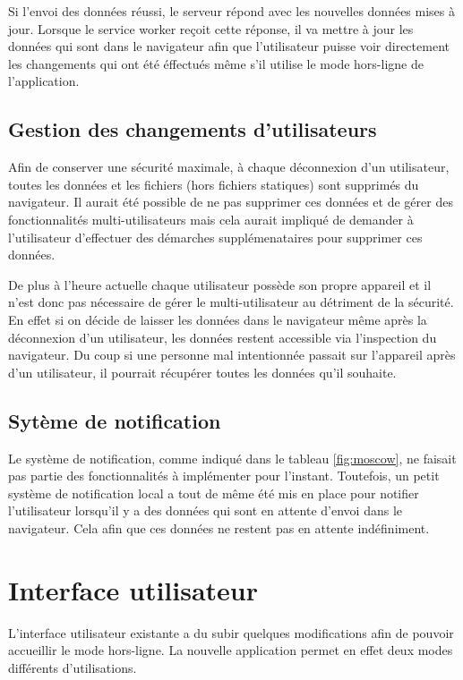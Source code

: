 \documentclass{EPL-master-thesis-covers-FR}
\begin{document}
					Si l'envoi des données réussi, le serveur répond avec les nouvelles données mises à jour. Lorsque le service worker reçoit cette réponse, il va mettre à jour les données qui sont dans le navigateur afin que l'utilisateur puisse voir directement les changements qui ont été éffectués même s'il utilise le mode hors-ligne de l'application.
			
			\subsection{Gestion des changements d'utilisateurs}		
				Afin de conserver une sécurité maximale, à chaque déconnexion d'un utilisateur, toutes les données et les fichiers (hors fichiers statiques) sont supprimés du navigateur. Il aurait été possible de ne pas supprimer ces données et de gérer des fonctionnalités multi-utilisateurs mais cela aurait impliqué de demander à l'utilisateur d'effectuer des démarches supplémenataires pour supprimer ces données. 
			
				De plus à l'heure actuelle chaque utilisateur possède son propre appareil et il n'est donc pas nécessaire de gérer le multi-utilisateur au détriment de la sécurité. En effet si on décide de laisser les données dans le navigateur même après la déconnexion d'un utilisateur, les données restent accessible via l'inspection du navigateur. Du coup si une personne mal intentionnée  passait sur l'appareil après d'un utilisateur, il pourrait récupérer toutes les données qu'il souhaite. 
				
			\subsection{Sytème de notification}
				Le système de notification, comme indiqué dans le tableau \ref{fig:moscow}, ne faisait pas partie des fonctionnalités à implémenter pour l'instant. Toutefois, un petit système de notification local a tout de même été mis en place pour notifier l'utilisateur lorsqu'il y a des données qui sont en attente d'envoi dans le navigateur. Cela afin que ces données ne restent pas en attente indéfiniment.
		
		
		\section{Interface utilisateur}
			L'interface utilisateur existante a du subir quelques modifications afin de pouvoir accueillir le mode hors-ligne. La nouvelle application permet en effet deux modes différents d'utilisations.
			
\end{document}
